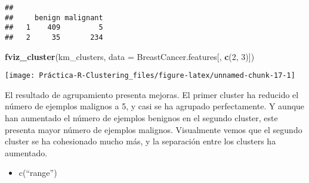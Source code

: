 \documentclass[]{article}
\newenvironment{Shaded}{\begin{snugshade}}{\end{snugshade}}
\newcommand{\CommentTok}[1]{\textcolor[rgb]{0.56,0.35,0.01}{\textit{#1}}}
\newcommand{\DataTypeTok}[1]{\textcolor[rgb]{0.13,0.29,0.53}{#1}}
\newcommand{\DecValTok}[1]{\textcolor[rgb]{0.00,0.00,0.81}{#1}}
\newcommand{\KeywordTok}[1]{\textcolor[rgb]{0.13,0.29,0.53}{\textbf{#1}}}
\newcommand{\NormalTok}[1]{#1}
\newcommand{\OperatorTok}[1]{\textcolor[rgb]{0.81,0.36,0.00}{\textbf{#1}}}
\newcommand{\StringTok}[1]{\textcolor[rgb]{0.31,0.60,0.02}{#1}}
\providecommand{\tightlist}{%
  \setlength{\itemsep}{0pt}\setlength{\parskip}{0pt}}
\begin{document}
\begin{verbatim}
##    
##     benign malignant
##   1    409         5
##   2     35       234
\end{verbatim}

\begin{Shaded}
\begin{Highlighting}[]
\KeywordTok{fviz_cluster}\NormalTok{(km_clusters, }\DataTypeTok{data =}\NormalTok{ BreastCancer.features[, }\KeywordTok{c}\NormalTok{(}\DecValTok{2}\NormalTok{, }\DecValTok{3}\NormalTok{)])}
\end{Highlighting}
\end{Shaded}

\begin{center}\texttt{[image: Práctica-R-Clustering\_files/figure-latex/unnamed-chunk-17-1]} \end{center}

El resultado de agrupamiento presenta mejoras. El primer cluster ha
reducido el número de ejemplos malignos a 5, y casi se ha agrupado
perfectamente. Y aunque han aumentado el número de ejemplos benignos en
el segundo cluster, este presenta mayor número de ejemplos malignos.
Visualmente vemos que el segundo cluster se ha cohesionado mucho más, y
la separación entre los clusters ha aumentado.

\begin{itemize}
\tightlist
\item
  c(``range'')
\end{itemize}

\begin{Shaded}
\end{Shaded}
\end{document}
